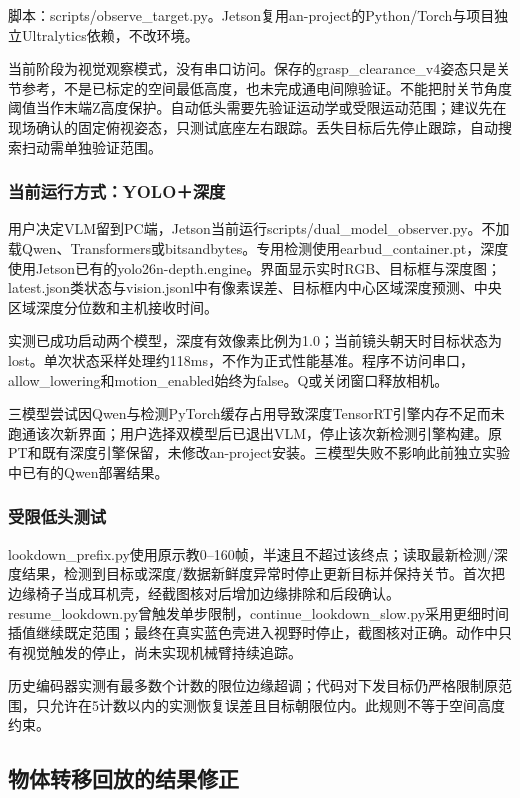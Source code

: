 脚本：scripts/observe\_target.py。Jetson复用an-project的Python/Torch与项目独立Ultralytics依赖，不改环境。

当前阶段为视觉观察模式，没有串口访问。保存的grasp\_clearance\_v4姿态只是关节参考，不是已标定的空间最低高度，也未完成通电间隙验证。不能把肘关节角度阈值当作末端Z高度保护。自动低头需要先验证运动学或受限运动范围；建议先在现场确认的固定俯视姿态，只测试底座左右跟踪。丢失目标后先停止跟踪，自动搜索扫动需单独验证范围。

\subsubsection{当前运行方式：YOLO＋深度}\label{s06-detail-9}

用户决定VLM留到PC端，Jetson当前运行scripts/dual\_model\_observer.py。不加载Qwen、Transformers或bitsandbytes。专用检测使用earbud\_container.pt，深度使用Jetson已有的yolo26n-depth.engine。界面显示实时RGB、目标框与深度图；latest.json类状态与vision.jsonl中有像素误差、目标框内中心区域深度预测、中央区域深度分位数和主机接收时间。

实测已成功启动两个模型，深度有效像素比例为1.0；当前镜头朝天时目标状态为lost。单次状态采样处理约118ms，不作为正式性能基准。程序不访问串口，allow\_lowering和motion\_enabled始终为false。Q或关闭窗口释放相机。

三模型尝试因Qwen与检测PyTorch缓存占用导致深度TensorRT引擎内存不足而未跑通该次新界面；用户选择双模型后已退出VLM，停止该次新检测引擎构建。原PT和既有深度引擎保留，未修改an-project安装。三模型失败不影响此前独立实验中已有的Qwen部署结果。

\subsubsection{受限低头测试}\label{s06-detail-10}

lookdown\_prefix.py使用原示教0--160帧，半速且不超过该终点；读取最新检测/深度结果，检测到目标或深度/数据新鲜度异常时停止更新目标并保持关节。首次把边缘椅子当成耳机壳，经截图核对后增加边缘排除和后段确认。resume\_lookdown.py曾触发单步限制，continue\_lookdown\_slow.py采用更细时间插值继续既定范围；最终在真实蓝色壳进入视野时停止，截图核对正确。动作中只有视觉触发的停止，尚未实现机械臂持续追踪。

历史编码器实测有最多数个计数的限位边缘超调；代码对下发目标仍严格限制原范围，只允许在5计数以内的实测恢复误差且目标朝限位内。此规则不等于空间高度约束。


\subsection{物体转移回放的结果修正}\label{s06-detail-11}


